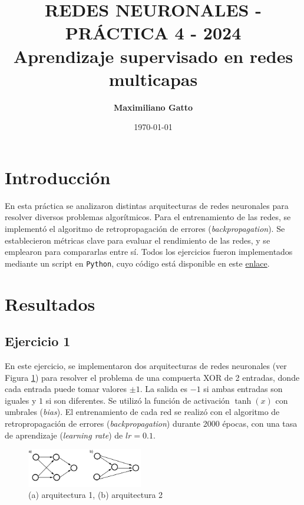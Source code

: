 \documentclass[11pt, twocolumn]{article}
\title{{\large REDES NEURONALES - PRÁCTICA 4 - 2024} \\ \vspace{1cm}\textbf{Aprendizaje supervisado en redes multicapas}}
\author[ ]{\textbf{Maximiliano Gatto}}
\affil[ ]{Instituto Balseiro (UNCuyo - CNEA) - Bariloche, Río Negro, Argentina\vspace{0.4cm}}
\affil[ ]{\href{mailto:maximiliano.gatto@ib.edu.ar}{maximiliano.gatto@ib.edu.ar}}
\date{\today}
\begin{document}
\maketitle

\section{Introducción}

En esta práctica se analizaron distintas arquitecturas de redes neuronales para resolver diversos problemas algorítmicos. Para el entrenamiento de las redes, se implementó el algoritmo de retropropagación de errores (\textit{backpropagation}). Se establecieron métricas clave para evaluar el rendimiento de las redes, y se emplearon para compararlas entre sí. Todos los ejercicios fueron implementados mediante un script en \texttt{Python}, cuyo código está disponible en este \href{https://github.com/elmasi2393/Redes-neuronales/tree/main}{enlace}.


\section{Resultados}

\subsection*{Ejercicio 1}
En este ejercicio, se implementaron dos arquitecturas de redes neuronales (ver Figura \ref{fig:arquitecturas}) para resolver el problema de una compuerta XOR de 2 entradas, donde cada entrada puede tomar valores \(\pm 1\). La salida es \(-1\) si ambas entradas son iguales y \(1\) si son diferentes. Se utilizó la función de activación \(\tanh(x)\) con umbrales (\textit{bias}). El entrenamiento de cada red se realizó con el algoritmo de retropropagación de errores (\textit{backpropagation}) durante 2000 épocas, con una tasa de aprendizaje (\textit{learning rate}) de \(lr = 0.1\).

\begin{figure} [htbp]
  \centering
  \includegraphics[width=0.45\textwidth]{figures/arquitecturas.png}
  \caption{(a) arquitectura 1, (b) arquitectura 2}
  \label{fig:arquitecturas}
\end{figure}
\end{document}
